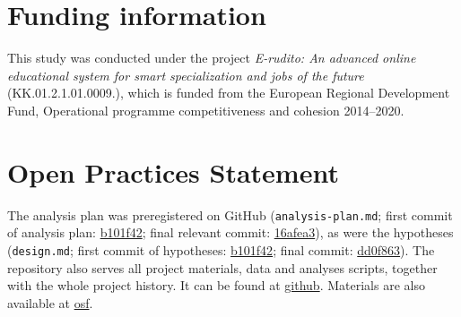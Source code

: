 \documentclass[12pt]{article}
\begin{document}
\section{Funding information}

This study was conducted under the project \textit{E-rudito: An
advanced online educational system for smart specialization and jobs of the
future} (KK.01.2.1.01.0009.), which is funded from the European Regional
Development Fund, Operational programme competitiveness and cohesion 2014--2020.

\section{Open Practices Statement}

The analysis plan was preregistered on GitHub (\texttt{analysis-plan.md};
first commit of analysis plan: \url{b101f42}; final relevant commit:
\url{16afea3}), as were the hypotheses (\texttt{design.md}; first commit of hypotheses:
\url{b101f42}; final commit: \url{dd0f863}).  The repository also serves all
project materials, data and analyses scripts, together with the whole project
history. It can be found at \url{github}.
Materials are also available at \url{osf}.

{}


\end{document}

